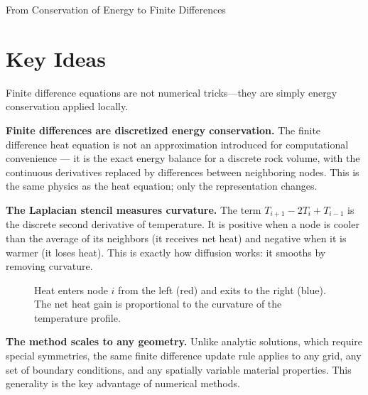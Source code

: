 \begin{activity}{From Conservation of Energy to Finite Differences}
\section*{Key Ideas}

Finite difference equations are not numerical tricks—they are simply energy conservation applied locally.

\textbf{Finite differences are discretized energy conservation.} The finite difference heat equation is not an approximation introduced for computational convenience — it is the exact energy balance for a discrete rock volume, with the continuous derivatives replaced by differences between neighboring nodes. This is the same physics as the heat equation; only the representation changes.

\textbf{The Laplacian stencil measures curvature.} The term $T_{i+1} - 2T_i + T_{i-1}$ is the discrete second derivative of temperature. It is positive when a node is cooler than the average of its neighbors (it receives net heat) and negative when it is warmer (it loses heat). This is exactly how diffusion works: it smooths by removing curvature.

\begin{figure}[h]
\centering
{}
\caption{Heat enters node $i$ from the left (red) and exits to the right (blue). The net heat gain is proportional to the curvature of the temperature profile.}
\end{figure}

\textbf{The method scales to any geometry.} Unlike analytic solutions, which require special symmetries, the same finite difference update rule applies to any grid, any set of boundary conditions, and any spatially variable material properties. This generality is the key advantage of numerical methods.

\end{activity}
